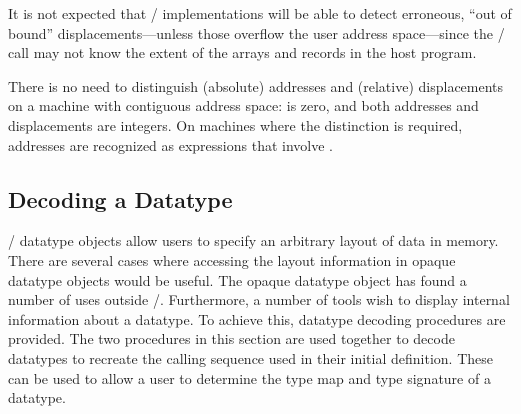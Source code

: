 \begin{users}
It is not expected that \MPI/ implementations will be able to detect
erroneous, ``out of bound'' displacements---unless those overflow the
user address space---since the \MPI/ call may not know the extent of the
arrays and records in the host program.
\end{users}



\begin{implementors}
There is no need to distinguish (absolute) addresses and (relative)
displacements on a machine with contiguous address space:
 is
zero, and both addresses and displacements are integers.  On machines where the
distinction is required, addresses are recognized as expressions that involve
.
\end{implementors}


\subsection{Decoding a Datatype}
\label{subsec:typeaccess}
\label{subsec:ei-dataaccess}

\MPI/
datatype objects
allow users to specify
an arbitrary layout of data in memory.
There are several cases
where accessing the layout information in
opaque datatype objects would be useful.
The opaque datatype
object has found a number of uses outside \mpi/.  Furthermore, a
number of tools wish to display internal information about a datatype.
To achieve this, datatype decoding procedures are provided.
The two procedures in this section are used together to decode datatypes
to recreate the calling sequence used in their initial definition.
These can be used to allow a user to determine the type map and type
signature of a datatype.

